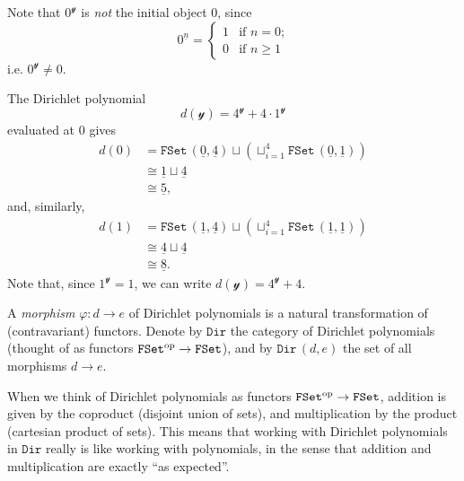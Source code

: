 \documentclass[11pt,fleqn]{article}
\renewcommand{\geq}{\geqslant}
\newcommand{\yon}{\mathcal{y}}
\newcommand{\op}{^\textnormal{op}}
\newcommand{\cat}[1]{\mathtt{#1}}
\newcommand{\FSet}{\cat{FSet}}
\newcommand{\cDir}{\cat{Dir}}
\begin{document}
Note that $0^\yon$ is \emph{not} the initial object $0$, since
\[
  0^{\underline{n}} =
  \begin{cases}
    1 &\mbox{if $n=0$;}
  \\0 &\mbox{if $n\geq1$}
  \end{cases}
\]
i.e. $0^\yon\neq0$.

\begin{example}
  The Dirichlet polynomial
  \[
    d(\yon) = 4^\yon + 4\cdot1^\yon
  \]
  evaluated at $0$ gives
  \[
    \begin{aligned}
      d(0)
      &= \FSet\,(\underline{0},\underline{4}) \sqcup \left( \sqcup_{i=1}^4 \FSet\,(\underline{0},\underline{1}) \right)
    \\&\cong \underline{1} \sqcup \underline{4}
    \\&\cong \underline{5},
    \end{aligned}
  \]
  and, similarly,
  \[
    \begin{aligned}
      d(1)
      &= \FSet\,(\underline{1},\underline{4}) \sqcup \left( \sqcup_{i=1}^4 \FSet\,(\underline{1},\underline{1}) \right)
    \\&\cong \underline{4} \sqcup \underline{4}
    \\&\cong \underline{8}.
    \end{aligned}
  \]
  Note that, since $1^\yon=1$, we can write $d(\yon)=4^\yon+4$.
\end{example}

\begin{definition}
  A \emph{morphism} $\varphi\colon d\to e$ of Dirichlet polynomials is a natural transformation of (contravariant) functors.
  Denote by $\cDir$ the category of Dirichlet polynomials (thought of as functors $\FSet\op\to\FSet$), and by $\cDir\,(d,e)$ the set of all morphisms $d\to e$.
\end{definition}

When we think of Dirichlet polynomials as functors $\FSet\op\to\FSet$, addition is given by the coproduct (disjoint union of sets), and multiplication by the product (cartesian product of sets).
This means that working with Dirichlet polynomials in $\cDir$ really is like working with polynomials, in the sense that addition and multiplication are exactly ``as expected''.
\end{document}
